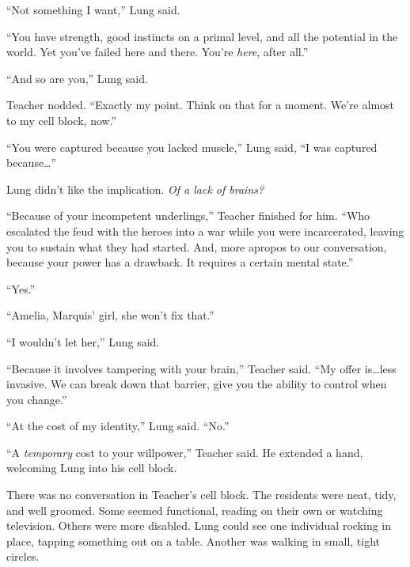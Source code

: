 ``Not something I want,'' Lung said.



``You have strength, good instincts on a primal level, and all the potential in the world.  Yet you've failed here and there.  You're \emph{here}, after all.''



``And so are you,'' Lung said.



Teacher nodded.  ``Exactly my point.  Think on that for a moment.  We're almost to my cell block, now.''



``You were captured because you lacked muscle,'' Lung said, ``I was captured because\ldots''



Lung didn't like the implication.  \emph{Of a lack of brains?}



``Because of your incompetent underlings,'' Teacher finished for him.  ``Who escalated the feud with the heroes into a war while you were incarcerated, leaving you to sustain what they had started.  And, more apropos to our conversation, because your power has a drawback.  It requires a certain mental state.''



``Yes.''



``Amelia, Marquis' girl, she won't fix that.''



``I wouldn't let her,'' Lung said.



``Because it involves tampering with your brain,'' Teacher said.  ``My offer is\ldots less invasive.  We can break down that barrier, give you the ability to control when you change.''



``At the cost of my identity,'' Lung said.  ``No.''



``A \emph{temporary} cost to your willpower,'' Teacher said.  He extended a hand, welcoming Lung into his cell block.



There was no conversation in Teacher's cell block.  The residents were neat, tidy, and well groomed.  Some seemed functional, reading on their own or watching television.  Others were more disabled.  Lung could see one individual rocking in place, tapping something out on a table.  Another was walking in small, tight circles.



